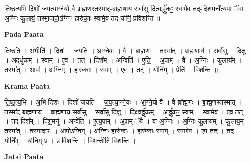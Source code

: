 \documentclass[17pt]{extarticle}
\begin{document}
ति॑ष्ठत्य॒भि दिशो॑ जयत्याग्ने॒यो वै ब्रा᳚ह्म॒णस्तस्मा᳚द्-ब्राह्म॒णाय॒ सर्वा॑सु दि॒क्ष्वर्द्धु॑कꣳ॒॒ स्वामे॒व तद्-दिश॒मन्वे᳚त्य॒पां ॅवा अ॒ग्निः कु॒लायं॒ तस्मा॒दापो॒ऽग्निꣳ हारु॑काः॒ स्वामे॒व तद्-योनिं॒ प्रवि॑शन्ति ॥ \newline

\textbf{Pada Paata} \newline

ति॒ष्ठ॒ति॒ । अ॒भीति॑ । दिशः॑ । ज॒य॒ति॒ । आ॒ग्ने॒यः । वै । ब्रा॒ह्म॒णः । तस्मा᳚त् । ब्रा॒ह्म॒णाय॑ । सर्वा॑सु । दि॒क्षु । अद्‌र्धु॑कम् । स्वाम् । ए॒व । तत् । दिश᳚म् । अन्विति॑ । ए॒ति॒ । अ॒पाम् । वै । अ॒ग्निः । कु॒लाय᳚म् । तस्मा᳚त् । आपः॑ । अ॒ग्निम् । हारु॑काः । स्वाम् । ए॒व । तत् । योनि᳚म् । प्रेति॑ । वि॒श॒न्ति॒ ॥  \newline


\textbf{Krama Paata} \newline

ति॒ष्ठ॒त्य॒भि । अ॒भि दिशः॑ । दिशो॑ जयति । ज॒य॒त्या॒ग्ने॒यः । आ॒ग्ने॒यो वै । वै ब्रा᳚ह्म॒णः । ब्रा॒ह्म॒णस्तस्मा᳚त् । तस्मा᳚द् ब्राह्म॒णाय॑ । ब्रा॒ह्म॒णाय॒ सर्वा॑सु । सर्वा॑सु दि॒क्षु । दि॒क्ष्वर्द्धु॑कम् । अर्द्धु॑कꣳ॒॒ स्वाम् । स्वामे॒व । ए॒व तत् । तद् दिश᳚म् । दिश॒मनु॑ । अन्वे॑ति । ए॒त्य॒पाम् । अ॒पाम् ॅवै । वा अ॒ग्निः । अ॒ग्निः कु॒लाय᳚म् । कु॒लाय॒म् तस्मा᳚त् । तस्मा॒दापः॑ । आपो॒ऽग्निम् । अ॒ग्निꣳ हारु॑काः । हारु॑काः॒ स्वाम् । स्वामे॒व । ए॒व तत् । तद् योनि᳚म् । योनि॒म् प्र । प्र वि॑शन्ति । वि॒श॒न्तीति॑ विशन्ति । \newline

\textbf{Jatai Paata} \newline
\end{document}
